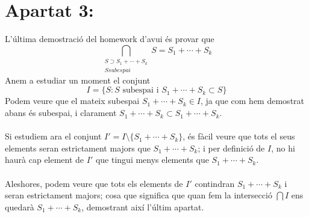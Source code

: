 \documentclass[a4paper, 12pt]{article}
\begin{document}
    \section*{Apartat 3:}
    L'\'ultima demostraci\'o del homework d'avui \'es provar que
    \begin{equation*}
        \bigcap_{\substack{S \supset S_1+\cdots+S_k\\S subespai}} S = S_1 + \cdots + S_k
    \end{equation*}
    Anem a estudiar un moment el conjunt
    \begin{equation*}
        I = \{ S : S \text{ subespai} \text{ i } S_1 + \cdots + S_k \subset S \}
    \end{equation*}
    Podem veure que el mateix subespai $S_1+\cdots+S_k \in I$, ja que com hem demostrat abans \'es subespai, i clarament $S_1 + \cdots + S_k \subset S_1 + \cdots + S_k$.\\\\
    Si estudiem ara el conjunt $I' = I\setminus \{ S_1+\cdots+S_k \}$, \'es f\`acil veure que tots el seus elements seran estrictament majors que $S_1 + \cdots + S_k$; i per definici\'o de $I$, no hi haur\`a cap element de $I'$ que tingui menys elements que $S_1 + \cdots + S_k$.\\\\
    Aleshores, podem veure que tots els elements de $I'$ contindran $S_1 + \cdots + S_k$ i seran estrictament majors; cosa que significa que quan fem la intersecci\'o $\bigcap I$ ens quedar\`a $S_1 + \cdots + S_k$, demostrant aix\'i l'\'ultim apartat.
\end{document}
